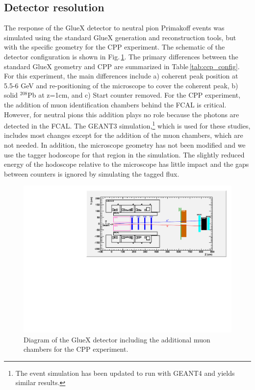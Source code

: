 \subsection{Detector resolution}
\label{sec:acceptance}
The response of the GlueX detector to neutral pion Primakoff events
was simulated using the standard GlueX generation and reconstruction
tools, but with the specific geometry for the CPP experiment. The schematic of the detector configuration is shown in
Fig.\,\ref{fig:GlueX_cpp}. The primary differences between the
standard GlueX geometry and CPP are summarized in
Table\,\ref{tab:ccp_config}. For this experiment, the main differences
include a) coherent peak position at 5.5-6 GeV and re-positioning of
the microscope to cover the coherent peak, b) solid $^{208}$Pb at
z=1cm, and c) Start counter removed. For the CPP experiment, the
addition of muon identification chambers behind the FCAL is
critical. However, for neutral pions this addition plays no role
because the photons are detected in the FCAL. The GEANT3 simulation,\footnote{The event simulation has been updated to run with GEANT4 and yields similar results.}
which is used for these studies, includes most changes except for the
addition of the muon chambers, which are not needed. In addition, the
microscope geometry has not been modified and we use the tagger
hodoscope for that region in the simulation. The slightly reduced
energy of the hodoscope relative to the microscope has little impact
and the gaps between counters is ignored by simulating the tagged
flux.
\begin{figure}[h!]
\centering
\includegraphics[width=5.25in]{figures/GlueX_cpp.pdf}
\caption{Diagram of the GlueX detector including the additional muon chambers for the CPP experiment.}
\label{fig:GlueX_cpp}
\end{figure}

